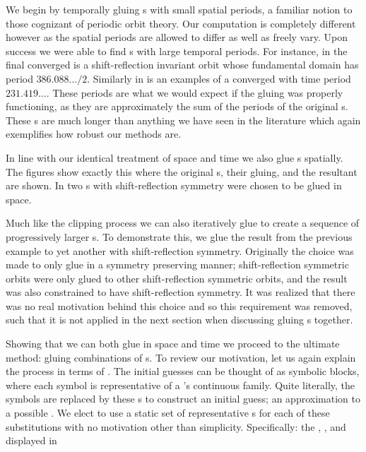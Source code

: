 We begin by temporally gluing {\po}s with small spatial periods,
a familiar notion to those cognizant of periodic orbit theory. Our computation
is completely different however as the spatial periods are allowed to differ
as well as freely vary.
Upon success we were able to find {\po}s with large temporal periods.
For instance, in %
the final converged {\po} is a shift-reflection invariant orbit whose fundamental domain
has period $386.088... / 2$. Similarly in %
is an examples of a converged {\rpo} with time period $231.419...$. These periods
are what we would expect if the gluing was properly functioning, as they are
approximately the sum of the periods of the original {\po}s.
These {\po}s are much longer than anything we have seen
in the literature which again exemplifies how robust
our {\spt} methods are.

In line with our identical treatment of space and time we also glue {\po}s spatially.
The figures %
show exactly this where the original {\po}s, their gluing, and the resultant {\po} are shown.
In %
two {\po}s with shift-reflection symmetry were chosen to be glued in space.

Much like the clipping process we can also iteratively glue to create a sequence of
progressively larger {\po}s. To demonstrate this, we glue the result
from the previous example to yet another {\po} with shift-reflection symmetry. Originally
the choice was made to only glue in a symmetry preserving manner; shift-reflection symmetric
orbits were only glued to other shift-reflection symmetric orbits, and the result was
also constrained to have shift-reflection symmetry. It was realized that there
was no real motivation behind this choice and so this requirement was removed, such that
it is not applied in the next section when discussing gluing {\fpo}s together.


Showing that we can both glue in space and time we proceed to
the ultimate method: gluing {\spt} combinations of {\fpo}s.
To review our motivation, let us again explain the process in terms of {\symbolic}.
The initial guesses can be thought of as symbolic blocks, where each symbol
is representative of a {\fpo}'s continuous family. Quite literally, the symbols are replaced
by these {\fpo}s to construct an initial guess; an approximation to a possible {\po}.
We elect to use a static set of
representative {\fpo}s for each of these substitutions with no motivation other
than simplicity. Specifically: the {},
{\wiggle}, and {\streak} displayed in %

